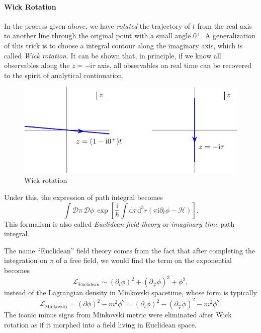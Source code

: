 \paragraph{Wick Rotation}
In the process given above, we have \emph{rotated} the trajectory of $t$ from the real axis to another line through the original point with a small angle $0^{+}$. A generalization of this trick is to choose a integral contour along the imaginary axis, which is called \emph{Wick rotation}. 
It can be shown that, in principle, if we know all observables along the $z = -\mathrm{i} \tau$ axis, all observables on real time can be recovered to the spirit of analytical continuation.
\begin{figure}[h]
  \centering
  \includegraphics{figure_wick_rotation.pdf}
  \caption{Wick rotation}
\end{figure}
Under this, the expression of path integral becomes 
\begin{equation}
  \int \mathcal{D} \pi \, \mathcal{D} \phi \, \exp \left[ \frac{\mathrm{i} }{\hbar} \int \mathrm{d} \tau \, \mathrm{d} ^{3} r \left( \pi \mathrm{i}  \partial_{t} \phi - \mathcal{H} \right)  \right] .
\end{equation}
This formalism is also called \emph{Euclidean field theory} or \emph{imaginary time} path integral.

The name ``Euclidean'' field theory comes from the fact that after completing the integration on $\pi$ of a free field, we would find the term on the exponential becomes
\begin{equation}
  \mathcal{L}_{\text{Euclidean}}\sim \left( \partial_{t} \phi \right) ^{2} + \left( \partial_{\vec{r}} \phi \right) ^{2} + \phi^{2},
\end{equation}
instead of the Lagrangian density in Minkovski spacetime, whose form is typically 
\begin{equation}
  \mathcal{L}_{\text{Minkovski}} = \left( \partial\phi \right) ^{2} - m^{2} \phi^{2} = \left( \partial_{t} \phi \right) ^{2} - \left( \partial_{\vec{r}} \phi \right) ^{2} - m^{2} \phi^{2}.
\end{equation}
The iconic minus signs from Minkovski metric were eliminated after Wick rotation as if it morphed into a field living in Euclidean space.


